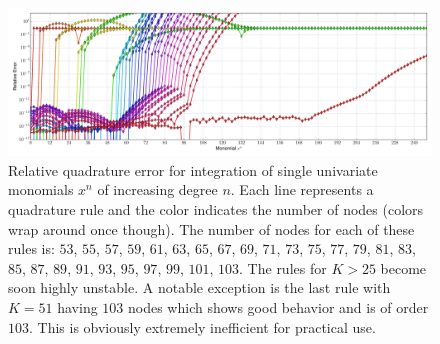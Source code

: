 \documentclass[a4paper,10pt]{article}
\begin{document}
\begin{figure}
  \centering
  \includegraphics[width=\linewidth]{./img/monomial_errors_hermitephy_high.pdf}
  \caption{Relative quadrature error for integration of single univariate monomials $x^n$ of increasing degree $n$.
  Each line represents a quadrature rule and the color indicates the number of nodes (colors wrap around once though).
  The number of nodes for each of these rules is:
  $53$, $55$, $57$, $59$, $61$, $63$, $65$, $67$, $69$, $71$, $73$, $75$,  $77$,
  $79$, $81$, $83$, $85$, $87$, $89$, $91$, $93$, $95$, $97$, $99$, $101$, $103$.
  The rules for $K > 25$ become soon highly unstable. A notable exception is the
  last rule with $K = 51$ having $103$ nodes which shows good behavior and
  is of order $103$. This is obviously extremely inefficient for practical
  use.}
  \label{fig:conv_monom_hermite_high}
\end{figure}
\end{document}
